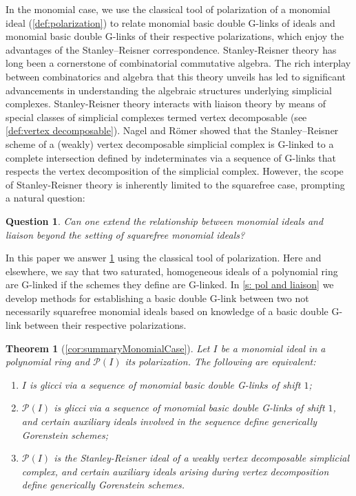 \documentclass[12pt, reqno]{amsart}
\numberwithin{equation}{section}
\newtheorem{Main Conjecture}[theorem]{Main Conjecture}
\theoremstyle{definition}
\theoremstyle{plain}
\newtheorem{question}{Question}
\newtheorem{introthm}{Theorem}
\renewcommand{\P}{\mathcal{P}}
\begin{document}
In the monomial case, we use the classical tool of polarization of a monomial ideal (\cref{def:polarization}) to relate monomial basic double G-links of ideals and monomial basic double G-links of their respective polarizations, which enjoy the advantages of the Stanley--Reisner correspondence. Stanley-Reisner theory has long been a cornerstone of combinatorial commutative algebra. %
The rich interplay between combinatorics and algebra that this theory unveils has led to significant advancements in understanding the algebraic structures underlying simplicial complexes. Stanley-Reisner theory interacts with liaison theory by means of special classes of simplicial complexes termed vertex decomposable (see \cref{def:vertex decomposable}). Nagel and R\"omer \cite{NR08} showed that the Stanley--Reisner scheme of a (weakly) vertex decomposable simplicial complex is G-linked to a complete intersection defined by indeterminates via a sequence of G-links that respects the vertex decomposition of the simplicial complex. However, the scope of Stanley-Reisner theory is inherently limited to the squarefree case, prompting a natural question: 

\begin{question}\label{q: nonsquarefree liaison}
Can one extend the relationship between monomial ideals and liaison beyond the setting of squarefree monomial ideals? 
\end{question}

In this paper we answer \cref{q: nonsquarefree liaison}  using the classical tool of polarization. Here and elsewhere, we say that two saturated, homogeneous ideals of a polynomial ring are G-linked if the schemes they define are G-linked. In \cref{s: pol and liaison} we develop methods for establishing a basic double G-link between two not necessarily squarefree monomial ideals based on knowledge of a basic double G-link between their respective polarizations.  

\begin{introthm}[\cref{cor:summaryMonomialCase}]
Let $I$ be a monomial ideal in a polynomial ring and $\P(I)$ its  polarization. The following are equivalent:
\begin{enumerate}
\item $I$ is glicci via a sequence of monomial basic double G-links of shift $1$;
\item $\P(I)$ is glicci via a sequence of monomial basic double G-links of shift $1$, and certain auxiliary ideals involved in the sequence define generically Gorenstein schemes;
\item $\P(I)$ is the Stanley-Reisner ideal of a weakly vertex decomposable simplicial complex, and certain auxiliary ideals arising during vertex decomposition define generically Gorenstein schemes.
\end{enumerate}
\end{introthm}
\end{document}
